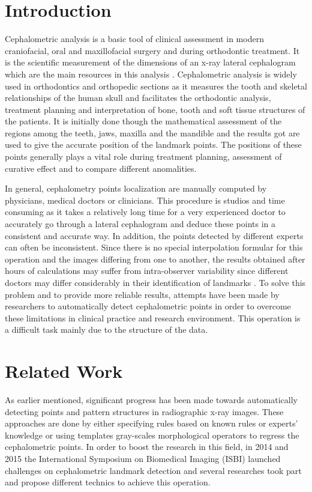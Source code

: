 \documentclass{elektr}
\begin{document}
\section{Introduction}
\label{Int} \tab Cephalometric analysis is a basic tool of clinical assessment in modern craniofacial, oral and maxillofacial surgery and during orthodontic treatment. It is the scientific measurement of the dimensions of an x-ray lateral cephalogram which are the main resources in this analysis \cite{ref1}. Cephalometric analysis is widely used in orthodontics and orthopedic sections as it measures the tooth and skeletal relationships of the human skull and facilitates the orthodontic analysis, treatment planning and interpretation of bone, tooth and soft tissue structures of the patients. It is initially done though the mathematical assessment of the regions among the teeth, jaws, maxilla and the mandible and the results got are used to give the accurate position of the landmark points. The positions of these points generally plays a vital role during treatment planning, assessment of curative effect and to compare different anomalities.

In general, cephalometry points localization are manually computed by physicians, medical doctors or clinicians. This procedure is studios and time consuming as it takes a relatively long time for a very experienced doctor to accurately go through a lateral cephalogram and deduce these points in a consistent and accurate way. In addition, the points detected by different experts can often be inconsistent. Since there is no special interpolation formular for this operation and the images differing from one to another, the results obtained after hours of calculations may suffer from intra-observer variability since different doctors may differ considerably in their identification of landmarks \cite{ref2}. To solve this problem and to provide more reliable results, attempts have been made by researchers to automatically detect cephalometric points in order to overcome these limitations in clinical practice and research environment. This operation is a difficult task mainly due to the structure of the data. 

\section{Related Work}

\tab As earlier mentioned, significant progress has been made towards automatically detecting points and pattern structures in radiographic x-ray images. These approaches are done by either specifying rules based on known rules or experts’ knowledge or using templates gray-scales morphological operators to regress the cephalometric points. In order to boost the research in this field, in 2014 and 2015 the International Symposium on Biomedical Imaging (ISBI) launched challenges on cephalometric landmark detection and several researches took part and propose different technics to achieve this operation. 
\end{document}
